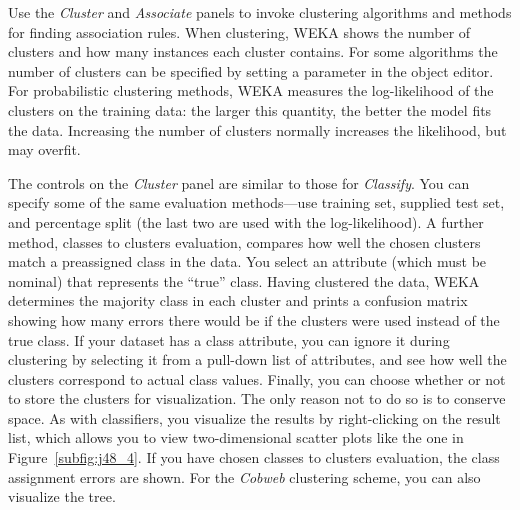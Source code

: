 Use the \textit{Cluster} and \textit{Associate} panels to invoke
clustering algorithms and methods for finding association rules. When
clustering, WEKA shows the number of clusters and how many instances
each cluster contains. For some algorithms the number of clusters can
be specified by setting a parameter in the object editor. For
probabilistic clustering methods, WEKA measures the log-likelihood of
the clusters on the training data: the larger this quantity, the
better the model fits the data. Increasing the number of clusters
normally increases the likelihood, but may overfit.

The controls on the \textit{Cluster} panel are similar to those for
\textit{Classify}. You can specify some of the same evaluation
methods---use training set, supplied test set, and percentage split
(the last two are used with the log-likelihood). A further method,
classes to clusters evaluation, compares how well the chosen clusters
match a preassigned class in the data. You select an attribute (which
must be nominal) that represents the ``true'' class. Having clustered
the data, WEKA determines the majority class in each cluster and
prints a confusion matrix showing how many errors there would be if
the clusters were used instead of the true class. If your dataset has
a class attribute, you can ignore it during clustering by selecting it
from a pull-down list of attributes, and see how well the clusters
correspond to actual class values. Finally, you can choose whether or
not to store the clusters for visualization. The only reason not to do
so is to conserve space. As with classifiers, you visualize the
results by right-clicking on the result list, which allows you to view
two-dimensional scatter plots like the one in
Figure~\ref{subfig:j48_4}. If you have chosen classes to clusters
evaluation, the class assignment errors are shown. For the
\textit{Cobweb} clustering scheme, you can also visualize the tree.

